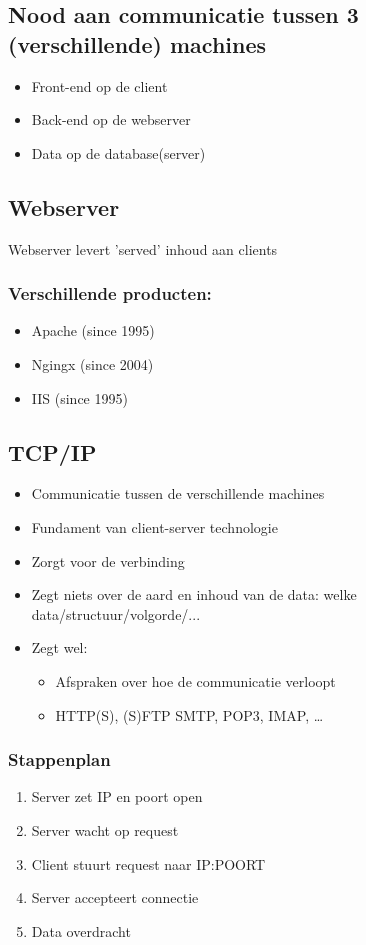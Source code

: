 \documentclass{article}
\begin{document}
\subsection{Nood aan communicatie tussen 3 (verschillende) machines}
\begin{itemize}
    \item Front-end op de client
    \item Back-end op de webserver
    \item Data op de database(server)
\end{itemize}


\subsection {Webserver}
Webserver levert 'served' inhoud aan clients
\subsubsection{Verschillende producten:}
\begin{itemize}
    \item Apache (since 1995)
    \item Ngingx (since 2004)
    \item IIS (since 1995)
\end{itemize}

\subsection {TCP/IP}

\begin{itemize}
    \item Communicatie tussen de verschillende machines
    \item Fundament van client-server technologie
    \item Zorgt voor de verbinding
    \item Zegt niets over de aard en inhoud van de data: welke data/structuur/volgorde/...
    \item Zegt wel:
    \begin{itemize}
        \item Afspraken over hoe de communicatie verloopt
        \item HTTP(S), (S)FTP SMTP, POP3, IMAP, \dots
    \end{itemize}
\end{itemize}


\subsubsection{Stappenplan}
\begin{enumerate}
    \item Server zet IP en poort open
    \item Server wacht op request
    \item Client stuurt request naar IP:POORT
    \item Server accepteert connectie
    \item Data overdracht
\end{enumerate}
\end{document}
